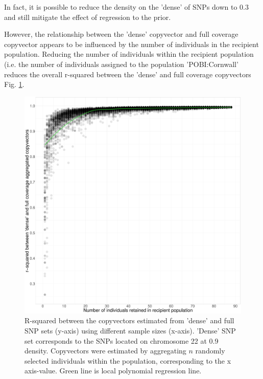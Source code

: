 In fact, it is possible to reduce the density on the 'dense' of SNPs down to 0.3 and still mitigate the effect of regression to the prior.

However, the relationship between the 'dense' copyvector and full coverage copyvector appears to be influenced by the number of individuals in the recipient population. Reducing the number of individuals within the recipient population (i.e. the number of individuals assigned to the population 'POBI:Cornwall' reduces the overall r-squared between the 'dense' and full coverage copyvectors Fig. \ref{fig:Ssparse_cornwall_collapsed_random_remove_inds}.

\begin{figure}[htp]
    \centering
    \includegraphics[width=1.0\textwidth]{../images/chapter1/Ssparse_cornwall_collapsed_random_remove_inds.pdf}
    \caption{R-squared between the copyvectors estimated from 'dense' and full SNP sets (y-axis) using different sample sizes (x-axis). 'Dense' SNP set corresponds to the SNPs located on chromosome 22 at 0.9 density. Copyvectors were estimated by aggregating $n$ randomly selected individuals within the population, corresponding to the x axis-value. Green line is local polynomial regression line. }
    \label{fig:Ssparse_cornwall_collapsed_random_remove_inds}
\end{figure}

